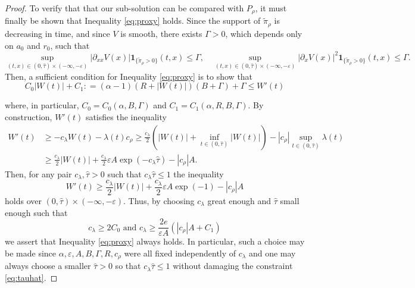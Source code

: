 \documentclass[a4paper,twosided, 11pt]{article}
\newcommand{\eps}{\varepsilon}
\newcommand {\e}  {\varepsilon}
\theoremstyle{plain}
\theoremstyle{remark}
\newcommand{\one}{\mathbf{1}}
\numberwithin{equation}{section}
\begin{document}
\begin{proof}
To verify that that our sub-solution can be compared with $P_\rho$, it must finally be shown that Inequality \eqref{eq:proxy} holds.
Since the support of $\tilde{\pi}_\rho$ is decreasing in time, and since $V$ is smooth, there exists $\Gamma > 0$, which depends only on $a_0$ and $r_0$, such that 
\[
 \sup_{(t,x) \in (0,\hat{\tau})\times (-\infty,-\e)}|\partial_{xx}V(x)|\one_{\{\tilde{\pi}_\rho >0\}}(t,x) \leq \Gamma, \quad   \sup_{(t,x) \in (0,\hat{\tau})\times (-\infty,-\e)}|\partial_{x}V(x)|^2 \one_{\{\tilde{\pi}_\rho >0\}}(t,x) \leq \Gamma.
\]
Then, a sufficient condition for Inequality \eqref{eq:proxy} is to show that 
\begin{equation}\label{eq:proxy2}
   C_0|W(t)| + C_1 : =(\alpha-1)(R+|W(t)|)(B+ \Gamma) +\Gamma \leqslant W'(t) 
\end{equation}

where, in particular, $C_0 = C_0(\alpha, B, \Gamma) $ and $C_1 =  C_1(\alpha,R,B,\Gamma)$.
By construction, $W'(t)$ satisfies the inequality
\begin{align*}
  W'(t)  & \geq - c_\lambda W(t) - \lambda(t) c_\rho \geq \frac{c_\lambda}{2}\left(|W(t)| + \inf_{t\in (0,\hat{\tau})} |W(t)|\right)  - |c_\rho| \sup_{t\in (0,\hat{\tau})} \lambda(t)\\
  &\geq \frac{c_\lambda}{2}|W(t)| + \frac{c_\lambda}{2}\eps A\exp(-c_\lambda \hat{\tau}) - |c_{\rho}| A.
\end{align*}
Then, for any pair $c_\lambda,\hat{\tau}>0 $ such that $c_\lambda \hat{\tau}\leq 1 $ the inequality 
\[
W'(t) \geq \frac{c_\lambda}{2}|W(t)| + \frac{c_\lambda}{2}\e A \exp(-1) -|c_{\rho}|A 
\]
holds over $(0,\hat{\tau})\times (-\infty,-\e)$.
Thus, by choosing $c_\lambda$ great enough and $\hat{\tau}$ small enough such that 
\[
c_\lambda \geq 2C_0 \text{ and } c_\lambda\geq \frac{2e}{\e A}(|c_\rho| A + C_1) 
\]
we  assert that Inequality \eqref{eq:proxy} always holds. 
In particular, such a choice may be made since $\alpha,\eps, A, B, \Gamma, R, c_\rho$ were all fixed independently of $c_\lambda$ and one may always choose a smaller $\hat{\tau}>0$ so that $c_\lambda \hat{\tau} \leq 1$ without damaging the constraint \eqref{eq:tauhat}.
\medskip 


\end{proof}
\end{document}
